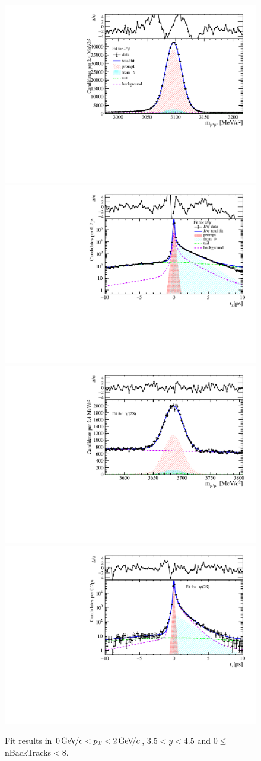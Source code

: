 \begin{figure}[H]
\begin{center}
\includegraphics[width=0.47\linewidth]{pdf/Jpsi/drawmassB/n1y3pt1.pdf}
\includegraphics[width=0.47\linewidth]{pdf/Jpsi/2DFitB/n1y3pt1.pdf}
\vspace*{-0.5cm}
\includegraphics[width=0.47\linewidth]{pdf/Psi2S/drawmassB/n1y3pt1.pdf}
\includegraphics[width=0.47\linewidth]{pdf/Psi2S/2DFitB/n1y3pt1.pdf}
\vspace*{-0.5cm}
\end{center}
\caption{Fit results in $0\text{\,Ge\kern -0.1em V\!/}c<p_{\mathrm{T}}<2\text{\,Ge\kern -0.1em V\!/}c$, $3.5<y<4.5$ and 0$\leq$nBackTracks$<$8.}
\label{Fitn1y3pt1}
\end{figure}
